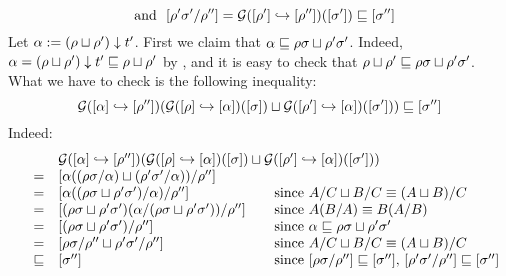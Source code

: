 \begin{enumerate}
\begin{enumerate}
\begin{enumerate}
\[        \ \text{ and }\ %
        \cls{\redseq'\redseqtwo'/\redseq''} = \ulbG(\pt{\cls{\redseq''}}{\cls{\redseq'}})(\cls{\redseqtwo'}) \permle \cls{\redseqtwo''}
      \]
      Let $\alpha := (\rho \sqcup \rho') \downarrow t'$.
      First we claim that $\alpha \sqsubseteq \rho\sigma \sqcup \rho'\sigma'$.
      Indeed, $\alpha = (\rho \sqcup \rho') \downarrow t' \sqsubseteq \rho \sqcup \rho'$
      by , and it is easy to check that
      $\rho \sqcup \rho' \sqsubseteq \rho\sigma \sqcup \rho'\sigma'$.
      What we have to check is the following inequality:
      \[
        \mathcal{G}({[\alpha]} \hookrightarrow {[\rho'']})(
          \mathcal{G}({[\rho]} \hookrightarrow {[\alpha]})({[\sigma]})
          \sqcup
          \mathcal{G}({[\rho']} \hookrightarrow {[\alpha]})({[\sigma']})
        )
        \sqsubseteq
        {[\sigma'']}
      \]
      Indeed:
      \[
        \begin{array}{rcll}
        &&
        \ulbG(\pt{\cls{\redseq''}}{\cls{\alpha}})(
          \ulbG(\pt{\cls{\alpha}}{\cls{\redseq}})(\cls{\redseqtwo})
          \sqcup
          \ulbG(\pt{\cls{\alpha}}{\cls{\redseq'}})(\cls{\redseqtwo'})
        ) \\
        & = &
        \cls{\alpha((\redseq\redseqtwo/\alpha) \sqcup (\redseq'\redseqtwo'/\alpha))/\redseq''}
        \\
        & = &
        \cls{\alpha((\redseq\redseqtwo \sqcup \redseq'\redseqtwo')/\alpha)/\redseq''}
        &\hspace{-3cm} \text{since $A/C \sqcup B/C \permeq (A \sqcup B)/C$}
        \\
        & = &
        \cls{(\redseq\redseqtwo \sqcup \redseq'\redseqtwo')(\alpha/(\redseq\redseqtwo \sqcup \redseq'\redseqtwo'))/\redseq''}
        &\hspace{-3cm} \text{since $A(B/A) \permeq B(A/B)$}
        \\
        & = &
        \cls{(\redseq\redseqtwo \sqcup \redseq'\redseqtwo')/\redseq''}
        &\hspace{-3cm} \text{since $\alpha \permle \redseq\redseqtwo \sqcup \redseq'\redseqtwo'$}
        \\
        & = &
        \cls{\redseq\redseqtwo/\redseq'' \sqcup \redseq'\redseqtwo'/\redseq''}
        &\hspace{-3cm} \text{since $A/C \sqcup B/C \permeq (A \sqcup B)/C$}
        \\
        & \permle &
        \cls{\redseqtwo''}
        &\hspace{-3cm} \text{since $\cls{\redseq\redseqtwo/\redseq''} \permle \cls{\redseqtwo''}$, $\cls{\redseq'\redseqtwo'/\redseq''} \permle \cls{\redseqtwo''}$}
        \end{array}
      \]
    \end{enumerate}
  \end{enumerate}


\end{enumerate}
